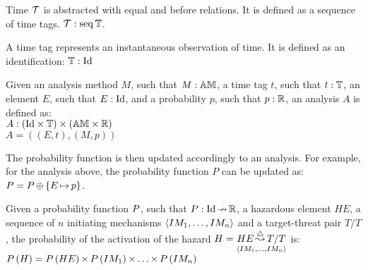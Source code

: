 \begin{definition}[Time]
Time $\hmdatatypetime$ is abstracted with equal and before relations. 
%
It is defined as a sequence of time tags.
%
$\hmdatatypetime: \hmseq{\hmdatatypetimetag}$.
\end{definition}

\begin{definition}
A time tag represents an instantaneous observation of time.
%
It is defined as an identification: $\hmdatatypetimetag: \hmdatatypeId$
\end{definition}

\begin{definition}[Analysis]
Given an analysis method $M$, such that $M: \hmdatatypeAM$, a time tag $t$, such that $t:\hmdatatypetimetag$, an element $E$, such that $E:\hmdatatypeId$, and a probability $p$, such that $p:\hmdatatypeR$, an analysis $A$ is defined as:
%
\\$A: \hmcartesian{\left(\hmcartesian{\hmdatatypeId}{\hmdatatypetimetag}\right)}{\left(\hmcartesian{\hmdatatypeAM}{\hmdatatypeR}\right)}$
%
\\$A = \left(\left(E, t\right), \left(M, p\right) \right)$

\end{definition}
The probability function is then updated accordingly to an analysis. For example, for the analysis above, the probability function $P$ can be updated as:
$\hmprobabilitysymbol = \hmoverride{\hmprobabilitysymbol}{\left\{\hmmapsto{E}{p}\right\}}$.

\begin{definition}
Given a probability function $\hmprobabilitysymbol$, such that $P: \hmpartialfunction {\hmdatatypeId}{\hmdatatypeR}$, a hazardous element $HE$, a sequence of $n$ initiating mechanisms $\hmseqenum{IM_1,\ldots,IM_n}$ and a target-threat pair $T/T$, the probability of the activation of the hazard $H = \hmhazard{HE}{\hmseqenum{IM_1,\ldots,IM_n}}{T/T}$ is:
%
\\$\hmprobability{H} = \hmtimes{\hmprobability{HE}}{\hmtimes{\hmtimes{\hmprobability{IM_1}}{\ldots}}{\hmprobability{IM_n}}}$
\end{definition}


